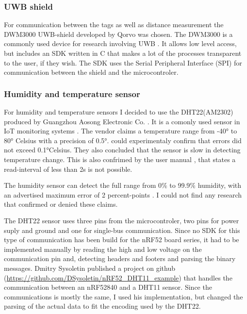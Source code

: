 \subsubsection{UWB shield}
For communication between the tags as well as distance measurement the DWM3000 UWB-shield developed by Qorvo was chosen.
The DWM3000 is a commonly used device for research involving UWB \cite{coppens2022overview, leu2022ghost, stocker2022performance}.
It allows low level access, but includes an SDK written in C that makes a lot of the processes transparent to the user, if they wish.
The SDK uses the Serial Peripheral Interface (SPI) for communication between the shield and the microcontroler.



\subsubsection{Humidity and temperature sensor}

For humidity and temperature sensors I decided to use the DHT22(AM2302) produced by Guangzhou Aosong Electronic Co. \cite{AM2302}. 
It is a comonly used sensor in IoT monitoring systems \cite{ahmad2021evaluation}. 
The vendor claims a temperature range from -40° to 80° Celsius with a precision of 0.5°. 
\cite{ahmad2021evaluation} could experimentaly confirm that errors did not exceed 0.1°Celsius. 
They also concluded that the sensor is slow in detecting temperature change. 
This is also confrimed by the user manual \cite{AM2302}, that states a read-interval of less than 2s is not possible. 

The humidity sensor can detect the full range from 0\% to 99.9\% humidity, with an advertised maximum error of 2 percent-points \cite{AM2302}.
I could not find any research that confirmed or denied these claims.

The DHT22 sensor uses three pins from the microcontroler, two pins for power suply and ground and one for single-bus communication.
Since no SDK for this type of communication has been build for the nRF52 board series, it had to be implemented manually by reading the high and low voltage on the communication pin and, detecting headers and footers and parsing the binary messages. 
Dmitry Sysoletin published a project on github (\url{https://github.com/DSysoletin/nRF52_DHT11_example}) that handles the communication between an nRF52840 and a DHT11 sensor. 
Since the communications is mostly the same, I used his implementation, but changed the parsing of the actual data to fit the encoding used by the DHT22.

